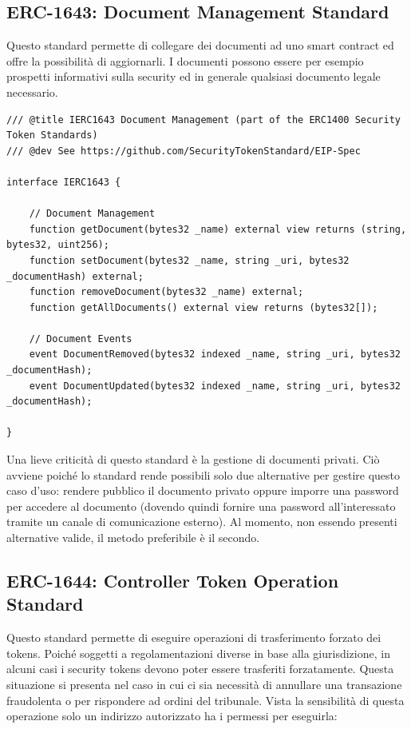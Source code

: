 \subsection{ERC-1643: Document Management Standard}
Questo standard permette di collegare dei documenti ad uno smart contract ed offre la possibilità di aggiornarli. I documenti possono essere per esempio prospetti informativi sulla security ed in generale qualsiasi documento legale necessario.
\begin{lstlisting}[language=Solidity,numbers=none]
/// @title IERC1643 Document Management (part of the ERC1400 Security Token Standards)
/// @dev See https://github.com/SecurityTokenStandard/EIP-Spec

interface IERC1643 {

    // Document Management
    function getDocument(bytes32 _name) external view returns (string, bytes32, uint256);
    function setDocument(bytes32 _name, string _uri, bytes32 _documentHash) external;
    function removeDocument(bytes32 _name) external;
    function getAllDocuments() external view returns (bytes32[]);

    // Document Events
    event DocumentRemoved(bytes32 indexed _name, string _uri, bytes32 _documentHash);
    event DocumentUpdated(bytes32 indexed _name, string _uri, bytes32 _documentHash);

}
\end{lstlisting}
Una lieve criticità di questo standard è la gestione di documenti privati. Ciò avviene poiché lo standard rende possibili solo due alternative per gestire questo caso d'uso: rendere pubblico il documento privato oppure imporre una password per accedere al documento (dovendo quindi fornire una password all'interessato tramite un canale di comunicazione esterno). Al momento, non essendo presenti alternative valide, il metodo preferibile è il secondo. 

\subsection{ERC-1644: Controller Token Operation Standard}
Questo standard permette di eseguire operazioni di trasferimento forzato dei tokens. Poiché soggetti a regolamentazioni diverse in base alla giurisdizione, in alcuni casi i security tokens devono poter essere trasferiti forzatamente. Questa situazione si presenta nel caso in cui ci sia necessità di annullare una transazione fraudolenta o per rispondere ad ordini del tribunale. Vista la sensibilità di questa operazione solo un indirizzo autorizzato ha i permessi per eseguirla:

